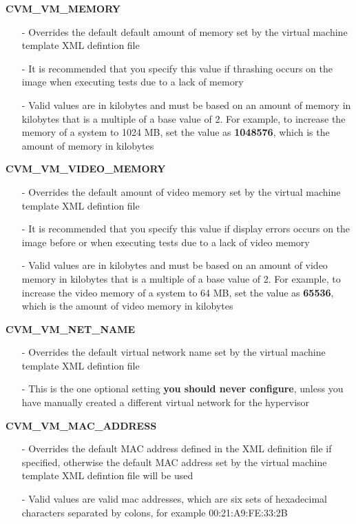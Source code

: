\begin{description}
\item {\bf CVM\_VM\_MEMORY}
		\begin{itemize}
		\item[-]	Overrides the default default amount of memory set by the virtual machine
				template XML defintion file
		\item[-]	It is recommended that you specify this value if thrashing occurs on the
				\cernvm image when executing tests due to a lack of memory
		\item[-]	Valid values are in kilobytes and must be based on an amount of memory in
				kilobytes that is a multiple of a base value of 2. For example, to increase
				the memory of a system to 1024 MB, set the value as {\bf 1048576}, which is the
				amount of memory in kilobytes
		\end{itemize}
		
\item {\bf CVM\_VM\_VIDEO\_MEMORY}
		\begin{itemize}
		\item[-]	Overrides the default amount of video memory set by the virtual machine
				template XML defintion file
		\item[-]	It is recommended that you specify this value if display errors occurs on the
				\cernvm image before or when executing tests due to a lack of video memory
		\item[-]	Valid values are in kilobytes and must be based on an amount of video memory in
				kilobytes that is a multiple of a base value of 2. For example, to increase
				the video memory of a system to 64 MB, set the value as {\bf 65536}, which is the
				amount of video memory in kilobytes
		\end{itemize}
		
\item {\bf CVM\_VM\_NET\_NAME}
		\begin{itemize}
		\item[-]	Overrides the default virtual network name set by the virtual machine
				template XML defintion file
		\item[-]	This is the one optional setting {\bf you should never configure}, unless you have
	  			manually created a different virtual network for the hypervisor
		\end{itemize}

\item {\bf CVM\_VM\_MAC\_ADDRESS}
		\begin{itemize}
		\item[-]	Overrides the default MAC address defined in the XML definition file if specified,
					otherwise the default MAC address set by the virtual machine template XML 
					defintion file will be used
		\item[-]	Valid values are valid mac addresses, which are six sets of hexadecimal characters
					separated by colons, for example 00:21:A9:FE:33:2B
		\end{itemize}
\end{description}


